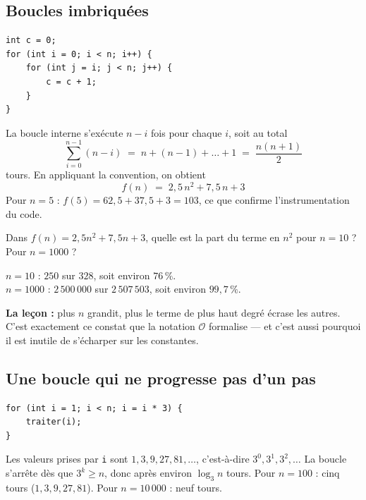 \documentclass[11pt,a4paper]{article}
\newcommand{\bigO}{\mathcal{O}}
\theoremstyle{definition}
\theoremstyle{remark}
\begin{document}
\subsection{Boucles imbriquées}

\begin{lstlisting}[caption={Boucle triangulaire}]
int c = 0;
for (int i = 0; i < n; i++) {
    for (int j = i; j < n; j++) {
        c = c + 1;
    }
}
\end{lstlisting}

La boucle interne s'exécute $n - i$ fois pour chaque $i$, soit au total
\[
\sum_{i=0}^{n-1} (n-i) \;=\; n + (n-1) + \dots + 1 \;=\; \frac{n(n+1)}{2}
\]
tours. En appliquant la convention, on obtient
\[
f(n) \;=\; 2{,}5\,n^2 + 7{,}5\,n + 3
\]
Pour $n = 5$ : $f(5) = 62{,}5 + 37{,}5 + 3 = 103$, ce que confirme
l'instrumentation du code.

\begin{appliboxQ}
Dans $f(n) = 2{,}5n^2 + 7{,}5n + 3$, quelle est la part du terme en $n^2$
pour $n = 10$ ? Pour $n = 1000$ ?
\end{appliboxQ}

\begin{appliboxR}[Réponse]
$n = 10$ : $250$ sur $328$, soit environ $76\,\%$.\\
$n = 1000$ : $2\,500\,000$ sur $2\,507\,503$, soit environ $99{,}7\,\%$.

\textbf{La leçon :} plus $n$ grandit, plus le terme de plus haut degré
écrase les autres. C'est exactement ce constat que la notation $\bigO$
formalise --- et c'est aussi pourquoi il est inutile de s'écharper sur les
constantes.
\end{appliboxR}

\subsection{Une boucle qui ne progresse pas d'un pas}

\begin{lstlisting}[caption={Progression multiplicative}]
for (int i = 1; i < n; i = i * 3) {
    traiter(i);
}
\end{lstlisting}

Les valeurs prises par \texttt{i} sont $1, 3, 9, 27, 81, \dots$, c'est-à-dire
$3^0, 3^1, 3^2, \dots$ La boucle s'arrête dès que $3^k \geq n$, donc après
environ $\log_3 n$ tours. Pour $n = 100$ : cinq tours ($1, 3, 9, 27, 81$).
Pour $n = 10\,000$ : neuf tours.
\end{document}
